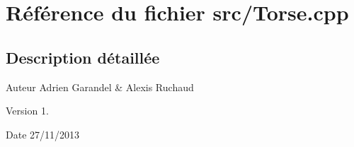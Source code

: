 \section{Référence du fichier src/\-Torse.cpp}
\label{_torse_8cpp}


\subsection{Description détaillée}
\begin{DoxyAuthor}{Auteur}
Adrien Garandel \& Alexis Ruchaud 
\end{DoxyAuthor}
\begin{DoxyVersion}{Version}
1. 
\end{DoxyVersion}
\begin{DoxyDate}{Date}
27/11/2013 
\end{DoxyDate}
